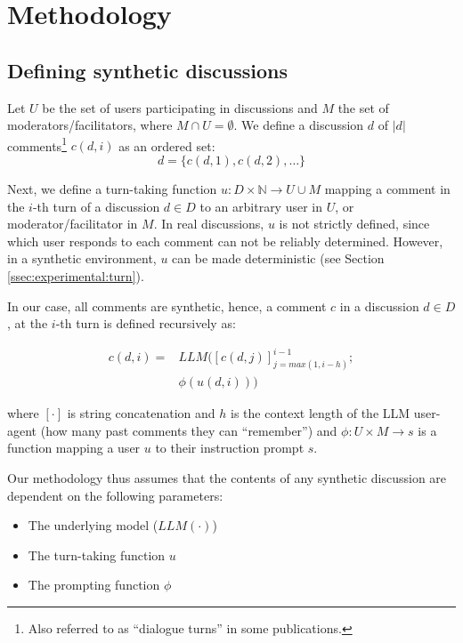 %

\section{Methodology}
\label{sec:methodology}

\subsection{Defining synthetic discussions}
\label{ssec:methodology:discussions}

Let $U$ be the set of users participating in discussions and $M$ the set of moderators/facilitators, where $M \cap U = \emptyset$. We define a discussion $d$ of $\lvert d \rvert$ comments\footnote{Also referred to as “dialogue turns” in some publications.} $c(d, i)$ as an ordered set:
\begin{equation}
    d = \{c(d, 1), c(d, 2), \ldots\}
\end{equation}


Next, we define a turn-taking function $u: D  \times \mathbb{N} \rightarrow U \cup M$ mapping a comment in the $i$-th turn of a discussion $d \in D$ to an arbitrary user in $U$, or moderator/facilitator in $M$. In real discussions, $u$ is not strictly defined, since which user responds to each comment can not be reliably determined. However, in a synthetic environment, $u$ can be made deterministic (see Section \ref{ssec:experimental:turn}).

In our case, all comments are synthetic, hence, a comment $c$ in a discussion $d \in D$, at the $i$-th turn is defined recursively as:

\begin{equation}
\label{eq:comment}
\begin{split}
    c(d, i) = & LLM([c(d, j)]^{i-1}_{j=max(1, i-h)};\\
    &\phi(u(d, i)))
\end{split}
\end{equation}

\noindent where $[\cdot]$ is string concatenation and $h$ is the context length of the \ac{LLM} user-agent (how many past comments they can “remember”) and $\phi: U \times M \rightarrow s$ is a function mapping a user $u$ to their instruction prompt $s$.

Our methodology thus assumes that the contents of any synthetic discussion are dependent on the following parameters:
\begin{itemize}[nosep, noitemsep]
    \item The underlying model ($LLM(\cdot)$)
    \item The turn-taking function $u$
    \item The prompting function $\phi$
\end{itemize}


